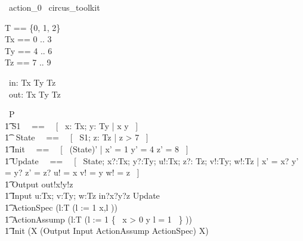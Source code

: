% 
\begin{zsection}
  \SECTION\ action\_0 \parents\ circus\_toolkit
\end{zsection}

\begin{zed}
    T == \{0, 1, 2\} \\
	Tx == 0 .. 3 \\ 
	Ty == 4 .. 6 \\ 
	Tz == 7 .. 9 \\ 
\end{zed}

\begin{circus}
	\circchannel\ in: Tx \cross Ty \cross Tz \\
	\circchannel\ out: Tx \cross Ty \cross Tz \\
\end{circus}

\begin{circus}
    \circprocess\ P \circdef \circbegin \\
        \t1 S1 ~~==~~ [~  x: Tx; y: Ty | x  \land y  ~] \\
        \t1 \circstate\ State ~~==~~ [~ S1; z: Tz | z > 7 ~] \\
        \t1 Init ~~==~~ [~ (State)' | x' = 1 \land y' = 4 \land z' = 8 ~] \\
        \t1 Update ~~==~~ [~ \Delta State; x?:Tx; y?:Ty; u!:Tx; z?: Tz; v!:Ty; w!:Tz | x' = x? \land y' = y? \land z' = z? \land u! = x \land v! = y \land w! = z ~] \\
        \t1 Output \circdef out!x!y!z \then \Skip \\
        \t1 Input \circdef \circvar u:Tx; v:Ty; w:Tz \circspot in?x?y?z \then \lschexpract Update \rschexpract \\
        \t1 ActionSpec \circdef (\circvar l:T \circspot (l := 1 \circseq x,l \prefixcolon [~ x > 0 \land y \leq 5 \land l = 1, x' = l \land l' = 0 \land y' = z - 3 \land z' \geq 8 ~])) \\
        \t1 ActionAssump \circdef (\circvar l:T \circspot (l := 1 \circseq \{~ x > 0 \land y  \land l = 1 ~\} \circseq [~ x' = l \land l' = 0 \land y' = z - 3 \land z' \geq 8 ~])) \\
        \t1 \circspot \lschexpract Init \rschexpract \circseq (\circmu X \circspot (Output \extchoice Input \extchoice ActionAssump \extchoice ActionSpec) \circseq X) \\ 
	\circend
\end{circus}

